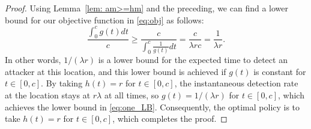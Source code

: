 \documentclass[10pt,a4paper]{amsart}
\begin{document}
\begin{proof}
Using Lemma~\ref{lem: am>=hm} and the preceding, we can find a lower bound for our objective function in \eqref{eq:obj} as follows:
\begin{equation}
\frac{\int_0^c g(t) dt}{c} \geq \frac{c}{\int_0^c \frac{1}{g(t)} dt} = \frac{c}{\lambda r c} = \frac{1}{\lambda r}.
\label{eq:one_LB}
\end{equation}
In other words,  $1 / (\lambda r)$ is a lower bound for the expected time to detect an attacker at this location, and this lower bound is achieved if $g(t)$ is constant for $t \in [0,c]$.
By taking $h(t) = r$ for $t \in [0,c]$, the instantaneous detection rate at the location stays at $r \lambda$ at all times, so $g(t) = 1/ (\lambda r)$ for $t \in [0,c]$, which achieves the lower bound in \eqref{eq:one_LB}.
Consequently, the optimal policy is to take $h(t) = r$ for $t \in [0,c]$, which completes the proof.
\end{proof}
\end{document}
